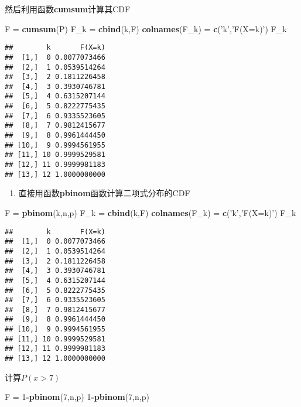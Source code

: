 \documentclass[]{article}
\newenvironment{Shaded}{\begin{snugshade}}{\end{snugshade}}
\newcommand{\DecValTok}[1]{\textcolor[rgb]{0.00,0.00,0.81}{#1}}
\newcommand{\KeywordTok}[1]{\textcolor[rgb]{0.13,0.29,0.53}{\textbf{#1}}}
\newcommand{\NormalTok}[1]{#1}
\newcommand{\OperatorTok}[1]{\textcolor[rgb]{0.81,0.36,0.00}{\textbf{#1}}}
\newcommand{\StringTok}[1]{\textcolor[rgb]{0.31,0.60,0.02}{#1}}
\providecommand{\tightlist}{%
  \setlength{\itemsep}{0pt}\setlength{\parskip}{0pt}}
\begin{document}
然后利用函数\textbf{cumsum}计算其CDF

\begin{Shaded}
\begin{Highlighting}[]
\NormalTok{F =}\StringTok{ }\KeywordTok{cumsum}\NormalTok{(P)}
\NormalTok{F_k =}\StringTok{ }\KeywordTok{cbind}\NormalTok{(k,F)}
\KeywordTok{colnames}\NormalTok{(F_k) =}\StringTok{ }\KeywordTok{c}\NormalTok{(}\StringTok{'k'}\NormalTok{,}\StringTok{'F(X=k)'}\NormalTok{)}
\NormalTok{F_k}
\end{Highlighting}
\end{Shaded}

\begin{verbatim}
##        k       F(X=k)
##  [1,]  0 0.0077073466
##  [2,]  1 0.0539514264
##  [3,]  2 0.1811226458
##  [4,]  3 0.3930746781
##  [5,]  4 0.6315207144
##  [6,]  5 0.8222775435
##  [7,]  6 0.9335523605
##  [8,]  7 0.9812415677
##  [9,]  8 0.9961444450
## [10,]  9 0.9994561955
## [11,] 10 0.9999529581
## [12,] 11 0.9999981183
## [13,] 12 1.0000000000
\end{verbatim}

\begin{enumerate}
\def\labelenumi{(\arabic{enumi})}
\setcounter{enumi}{1}
\tightlist
\item
  直接用函数\textbf{pbinom}函数计算二项式分布的CDF
\end{enumerate}

\begin{Shaded}
\begin{Highlighting}[]
\NormalTok{F =}\StringTok{ }\KeywordTok{pbinom}\NormalTok{(k,n,p)}
\NormalTok{F_k =}\StringTok{ }\KeywordTok{cbind}\NormalTok{(k,F)}
\KeywordTok{colnames}\NormalTok{(F_k) =}\StringTok{ }\KeywordTok{c}\NormalTok{(}\StringTok{'k'}\NormalTok{,}\StringTok{'F(X=k)'}\NormalTok{)}
\NormalTok{F_k}
\end{Highlighting}
\end{Shaded}

\begin{verbatim}
##        k       F(X=k)
##  [1,]  0 0.0077073466
##  [2,]  1 0.0539514264
##  [3,]  2 0.1811226458
##  [4,]  3 0.3930746781
##  [5,]  4 0.6315207144
##  [6,]  5 0.8222775435
##  [7,]  6 0.9335523605
##  [8,]  7 0.9812415677
##  [9,]  8 0.9961444450
## [10,]  9 0.9994561955
## [11,] 10 0.9999529581
## [12,] 11 0.9999981183
## [13,] 12 1.0000000000
\end{verbatim}

计算\(P(x>7)\)

\begin{Shaded}
\begin{Highlighting}[]
\NormalTok{F =}\StringTok{ }\DecValTok{1}\OperatorTok{-}\KeywordTok{pbinom}\NormalTok{(}\DecValTok{7}\NormalTok{,n,p)}
\DecValTok{1}\OperatorTok{-}\KeywordTok{pbinom}\NormalTok{(}\DecValTok{7}\NormalTok{,n,p)}
\end{Highlighting}
\end{Shaded}
\end{document}
